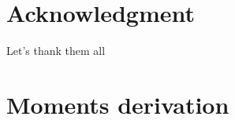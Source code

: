 \documentclass[english,11pt]{article}
\newcommand{\1}{\mathbf{1}}
\newcommand{\II}{\mathcal{I}}
\newcommand{\mk}{\mathfrak}
\numberwithin{equation}{section}
\theoremstyle{plain}
\theoremstyle{definition}
\theoremstyle{remark}
\theoremstyle{plain}
\theoremstyle{remark}
\theoremstyle{plain}
\theoremstyle{plain}
\newcommand{\be}{\begin{equation}}
\newcommand{\ee}{\end{equation}}
\begin{document}
%

\section*{Acknowledgment}
Let's thank them all






\appendix


\section{Moments derivation}
\end{document}

